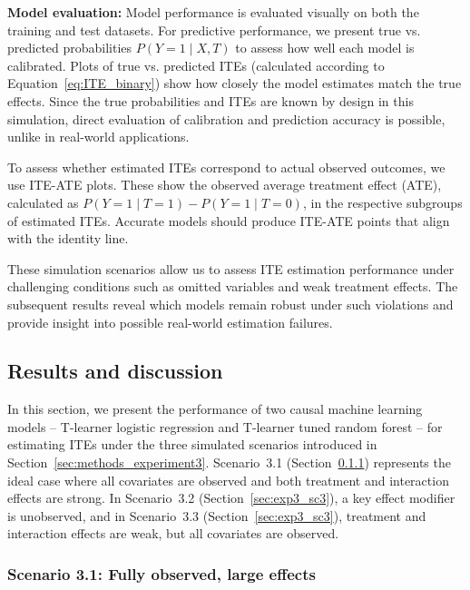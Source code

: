 \medskip

\textbf{Model evaluation:} Model performance is evaluated visually on both the training and test datasets. For predictive performance, we present true vs. predicted probabilities $P(Y = 1 \mid X, T)$ to assess how well each model is calibrated. Plots of true vs. predicted ITEs (calculated according to Equation~\ref{eq:ITE_binary}) show how closely the model estimates match the true effects. Since the true probabilities and ITEs are known by design in this simulation, direct evaluation of calibration and prediction accuracy is possible, unlike in real-world applications.

To assess whether estimated ITEs correspond to actual observed outcomes, we use ITE-ATE plots. These show the observed average treatment effect (ATE), calculated as $P(Y = 1 \mid T = 1) - P(Y = 1 \mid T = 0)$, in the respective subgroups of estimated ITEs. Accurate models should produce ITE-ATE points that align with the identity line.

These simulation scenarios allow us to assess ITE estimation performance under challenging conditions such as omitted variables and weak treatment effects. The subsequent results reveal which models remain robust under such violations and provide insight into possible real-world estimation failures.




\subsection{Results and discussion} \label{sec:results_experiment3}

In this section, we present the performance of two causal machine learning models -- T-learner logistic regression and T-learner tuned random forest -- for estimating ITEs under the three simulated scenarios introduced in Section~\ref{sec:methods_experiment3}. Scenario~3.1 (Section~\ref{sec:exp3_sc1}) represents the ideal case where all covariates are observed and both treatment and interaction effects are strong. In Scenario~3.2 (Section~\ref{sec:exp3_sc3}), a key effect modifier is unobserved, and in Scenario~3.3 (Section~\ref{sec:exp3_sc3}), treatment and interaction effects are weak, but all covariates are observed.




\subsubsection{Scenario 3.1: Fully observed, large effects} \label{sec:exp3_sc1}







